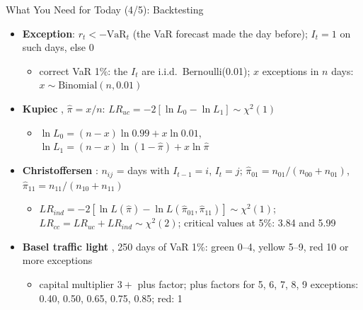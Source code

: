 \begin{frame}{What You Need for Today (4/5): Backtesting}
\itemsize{\footnotesize}
\begin{itemize}
    \item \textbf{Exception}: $r_t < -\mathrm{VaR}_t$ (the VaR forecast made the day before); $I_t = 1$ on such days, else 0
    \begin{itemize}
        \item correct VaR 1\%: the $I_t$ are i.i.d.\ Bernoulli(0.01); $x$ exceptions in $n$ days: $x \sim \mathrm{Binomial}(n, 0.01)$
    \end{itemize}
    \item \textbf{Kupiec} , $\hat\pi = x/n$: $LR_{uc} = -2[\ln L_0 - \ln L_1] \sim \chi^2(1)$
    \begin{itemize}
        \item $\ln L_0 = (n - x)\ln 0.99 + x\ln 0.01$, \quad $\ln L_1 = (n - x)\ln(1 - \hat\pi) + x\ln\hat\pi$
    \end{itemize}
    \item \textbf{Christoffersen} : $n_{ij}$ = days with $I_{t-1} = i$, $I_t = j$; $\hat\pi_{01} = n_{01}/(n_{00} + n_{01})$, $\hat\pi_{11} = n_{11}/(n_{10} + n_{11})$
    \begin{itemize}
        \item $LR_{ind} = -2[\ln L(\hat\pi) - \ln L(\hat\pi_{01}, \hat\pi_{11})] \sim \chi^2(1)$; $LR_{cc} = LR_{uc} + LR_{ind} \sim \chi^2(2)$; critical values at 5\%: 3.84 and 5.99
    \end{itemize}
    \item \textbf{Basel traffic light} , 250 days of VaR 1\%: green 0--4, yellow 5--9, red 10 or more exceptions
    \begin{itemize}
        \item capital multiplier $3 + $ plus factor; plus factors for 5, 6, 7, 8, 9 exceptions: 0.40, 0.50, 0.65, 0.75, 0.85; red: 1
    \end{itemize}
\end{itemize}
\end{frame}

